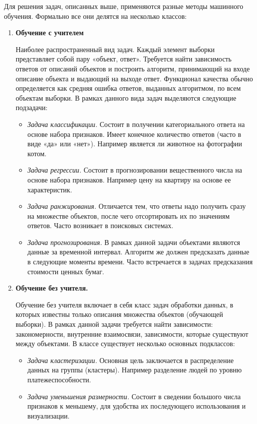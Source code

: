 Для решения задач, описанных выше, применяются разные методы машинного обучения. Формально все они делятся на несколько классов:
\begin{enumerate}
	\item \textbf{Обучение с учителем} 
	
	Наиболее распространенный вид задач. Каждый элемент выборки представляет собой пару «объект, ответ». Требуется найти зависимость ответов от описаний объектов и построить алгоритм, принимающий на входе описание объекта и выдающий на выходе ответ. Функционал качества обычно определяется как средняя ошибка ответов, выданных алгоритмом, по всем объектам выборки. В рамках данного вида задач выделяются следующие подзадачи:
	\begin{itemize}
		\item  {\it Задача классификации.} Состоит в получении категориального ответа на основе набора признаков. Имеет конечное количество ответов (часто в виде «да» или «нет»). Например является ли животное на фотографии котом.
		\item  {\it Задача регрессии.} Состоит в прогнозировании вещественного числа на основе набора признаков. Например цену на квартиру на основе ее характеристик. 
		\item  {\it Задача ранжирования.} Отличается тем, что ответы надо получить сразу на множестве объектов, после чего отсортировать их по значениям ответов. Часто возникает в поисковых системах. 
		\item  {\it Задача прогнозирования.}  В рамках данной задачи объектами являются данные за временной интервал. Алгоритм же должен предсказать данные в следующие моменты времени. Часто встречается в задачах предсказания стоимости ценных бумаг.
	\end{itemize}
	
	\item \textbf{Обучение без учителя.}
	
	Обучение без учителя включает в себя класс задач обработки данных, в которых известны только описания множества объектов (обучающей выборки). В рамках данной задачи требуется найти зависимости: закономерности, внутренние взаимосвязи, зависимости, которые существуют между объектами. В классе существует несколько основных подклассов:
	\begin{itemize}
		\item  {\it Задача кластеризации.} Основная цель заключается в  распределение данных на группы (кластеры). Например разделение людей по уровню платежеспособности.
		\item  {\it Задача уменьшения размерности.} Состоит в сведении большого числа признаков к меньшему, для удобства их последующего использования и визуализации.
	\end{itemize}
	

\end{enumerate}
